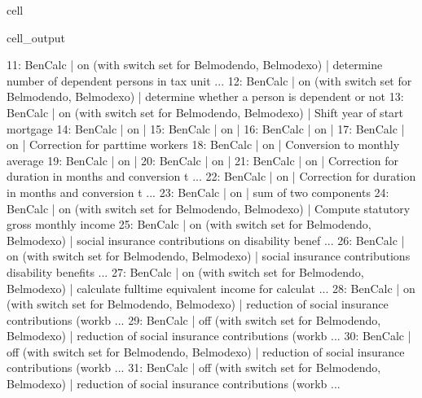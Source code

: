 \documentclass[letterpaper,10pt,english]{sphinxmanual}
\begin{document}
\begin{sphinxuseclass}{cell}
\begin{sphinxuseclass}{cell_output}
\begin{sphinxVerbatim}[commandchars=\\\{\}]
11: BenCalc      | on (with switch set for Belmod\PYGZus{}endo, Belmod\PYGZus{}exo)         |    determine number of dependent persons in tax unit  ... 
12: BenCalc      | on (with switch set for Belmod\PYGZus{}endo, Belmod\PYGZus{}exo)         |    determine whether a person is dependent or not 
13: BenCalc      | on (with switch set for Belmod\PYGZus{}endo, Belmod\PYGZus{}exo)         |    Shift year of start mortgage 
14: BenCalc      | on                                                       |     
15: BenCalc      | on                                                       |     
16: BenCalc      | on                                                       |     
17: BenCalc      | on                                                       |    Correction for part\PYGZhy{}time workers 
18: BenCalc      | on                                                       |    Conversion to monthly average 
19: BenCalc      | on                                                       |     
20: BenCalc      | on                                                       |     
21: BenCalc      | on                                                       |    Correction for duration in months and conversion t ... 
22: BenCalc      | on                                                       |    Correction for duration in months and conversion t ... 
23: BenCalc      | on                                                       |    sum of two components 
24: BenCalc      | on (with switch set for Belmod\PYGZus{}endo, Belmod\PYGZus{}exo)         |    Compute statutory gross monthly income 
25: BenCalc      | on (with switch set for Belmod\PYGZus{}endo, Belmod\PYGZus{}exo)         |    social insurance contributions on disability benef ... 
26: BenCalc      | on (with switch set for Belmod\PYGZus{}endo, Belmod\PYGZus{}exo)         |    social insurance contributions disability benefits ... 
27: BenCalc      | on (with switch set for Belmod\PYGZus{}endo, Belmod\PYGZus{}exo)         |    calculate full\PYGZhy{}time equivalent income for calculat ... 
28: BenCalc      | on (with switch set for Belmod\PYGZus{}endo, Belmod\PYGZus{}exo)         |    reduction of social insurance contributions (workb ... 
29: BenCalc      | off (with switch set for Belmod\PYGZus{}endo, Belmod\PYGZus{}exo)        |    reduction of social insurance contributions (workb ... 
30: BenCalc      | off (with switch set for Belmod\PYGZus{}endo, Belmod\PYGZus{}exo)        |    reduction of social insurance contributions (workb ... 
31: BenCalc      | off (with switch set for Belmod\PYGZus{}endo, Belmod\PYGZus{}exo)        |    reduction of social insurance contributions (workb ... 

\end{sphinxVerbatim}
\end{sphinxuseclass}
\end{sphinxuseclass}
\end{document}
